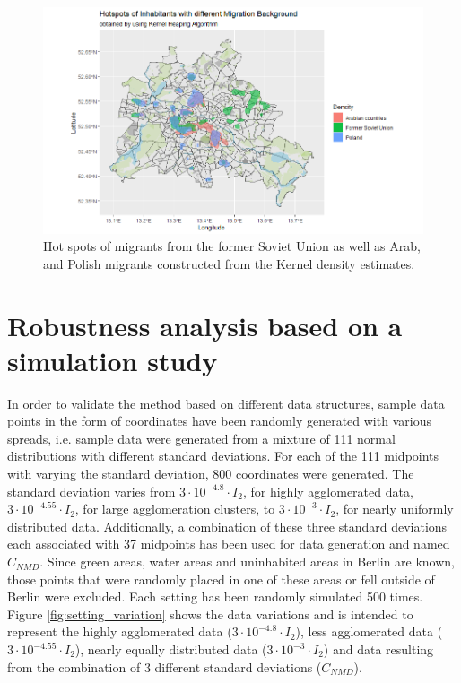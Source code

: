 \begin{figure}[h]
    \centering
    \includegraphics[scale = 0.55]{Figure/KH_Part3.png}
    \caption{Hot spots of migrants from the former Soviet Union as well as Arab, and Polish migrants constructed from the Kernel density estimates.}
    \label{fig:DifferentMigrationHotspots}
\end{figure}


\hypertarget{Robustness-analysis-based-on-a-simulation-study}{%
\section{Robustness analysis based on a simulation study}\label{Robustness-analysis-based-on-a-simulation-study}}

In order to validate the method based on different data structures, sample data points in the form of coordinates have been randomly generated with various spreads, i.e. sample data were generated from a mixture of 111 normal distributions with different standard deviations. 
For each of the 111 midpoints with varying the standard deviation, 800 coordinates were generated. The standard deviation varies from $3\cdot 10^{-4.8} \cdot I_2$, for highly agglomerated data, 
$3\cdot 10^{-4.55} \cdot I_2$, for large agglomeration clusters, to $3\cdot 10^{-3} \cdot I_2 $, for nearly uniformly distributed data. 
Additionally, a combination of these three standard deviations each associated with 37 midpoints has been used for data generation and named $C_{NMD}$. 
Since green areas, water areas and uninhabited areas in Berlin are known, those points that were randomly placed in one of these areas or fell outside of Berlin were excluded. Each setting has been randomly simulated 500 times. 
Figure \ref{fig:setting_variation} shows the data variations and is intended to represent the highly agglomerated data ($3\cdot 10^{-4.8} \cdot I_2$), less agglomerated data ($3\cdot 10^{-4.55} \cdot I_2$), nearly equally distributed data ($3\cdot 10^{-3} \cdot I_2$) and data resulting from the combination of 3 different standard deviations ($C_{NMD}$).  


